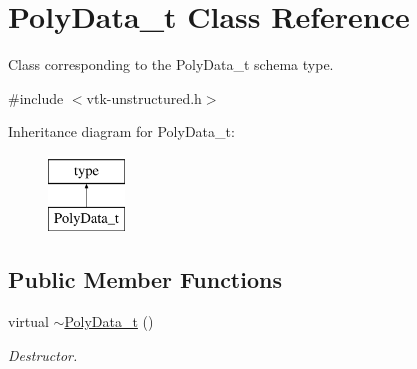 \hypertarget{classPolyData__t}{}\section{Poly\+Data\+\_\+t Class Reference}
\label{classPolyData__t}


Class corresponding to the Poly\+Data\+\_\+t schema type.  




{\ttfamily \#include $<$vtk-\/unstructured.\+h$>$}

Inheritance diagram for Poly\+Data\+\_\+t\+:\begin{figure}[H]
\begin{center}
\leavevmode
\includegraphics[height=2.000000cm]{classPolyData__t}
\end{center}
\end{figure}
\subsection*{Public Member Functions}
\begin{DoxyCompactItemize}
\item 
virtual \hyperlink{classPolyData__t_afefe18d998d21a0557e30c06b4089b99}{$\sim$\+Poly\+Data\+\_\+t} ()
\begin{DoxyCompactList}\small\item\em Destructor. \end{DoxyCompactList}\end{DoxyCompactItemize}
